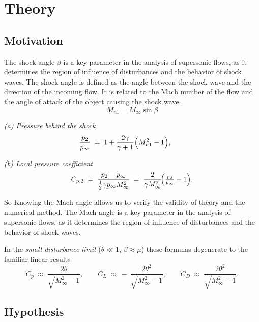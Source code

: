 \newpage

\section{Theory}
\label{sec:theory}


\subsection{Motivation}
\label{subsec:motivation}

The shock angle $\beta$ is a key parameter in the analysis of supersonic flows, as it determines the region of influence of disturbances and the behavior of shock waves. The shock angle is defined as the angle between the shock wave and the direction of the incoming flow. It is related to the Mach number of the flow and the angle of attack of the object causing the shock wave.
\begin{equation}
	M_{n1}=M_\infty\sin\beta
\end{equation}
\vspace{4pt}
\begin{minipage}{0.48\linewidth}
\textit{(a) Pressure behind the shock}
\[
	\frac{p_2}{p_\infty}
	\;=\;
	1+\frac{2\gamma}{\gamma+1}\Bigl(M_{n1}^2-1\Bigr),
	\qquad
\]
\end{minipage}
\hfill
\begin{minipage}{0.48\linewidth}
\textit{(b) Local pressure coefficient}
\[
	C_{p,2}
	\;=\;
	\frac{p_2-p_\infty}{\tfrac12\gamma p_\infty M_\infty^2}
	\;=\;
	\frac{2}{\gamma M_\infty^{2}}\!
	\Bigl(\tfrac{p_2}{p_\infty}-1\Bigr).
\]
\end{minipage}

So Knowing the Mach angle allows us to verify the validity of theory and the numerical method. The Mach angle is a key parameter in the analysis of supersonic flows, as it determines the region of influence of disturbances and the behavior of shock waves. 


In the \emph{small‐disturbance limit} ($\theta\ll1$, $\beta\approx\mu$) these formulas degenerate to the familiar linear results
\[
	C_p \;\approx\; \frac{2\theta}{\sqrt{M_\infty^{2}-1}},
	\qquad
	C_L \;\approx\; -\,\frac{2\theta^{2}}{\sqrt{M_\infty^{2}-1}},
	\qquad
	C_D \;\approx\; \frac{2\theta^{2}}{\sqrt{M_\infty^{2}-1}}.
\]


\subsection{Hypothesis}
\label{subsec:hypothesis}


